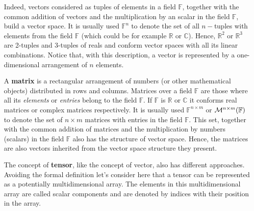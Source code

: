 Indeed, vectors considered as tuples of elements in a field $\mathbb{F}$, together with the common addition of vectors and the multiplication by an scalar in the field $\mathbb{F}$, build a vector space. 
It is usually used $\mathbb{F}^{n}$ to denote the set of all $n-$tuples with elements from the field $\mathbb{F}$ (which could be for example $\mathbb{R}$ or $\mathbb{C}$). 
Hence, $\mathbb{R}^{2}$ or $\mathbb{R}^{3}$ are 2-tuples and 3-tuples of reals and conform vector spaces with all its linear combinations.
Notice that, with this description, a vector is represented by a one-dimensional arrangement of $n$ elements. %

A \textbf{matrix} is a rectangular arrangement of numbers (or other mathematical objects) distributed in rows and columns.
Matrices over a field $\mathbb{F}$ are those where all its \textit{elements} or \textit{entries} belong to the field $\mathbb{F}$.
If $\mathbb{F}$ is $\mathbb{R}$ or $\mathbb{C}$ it conforms real matrices or complex matrices respectively.
It is usually used $\mathbb{F}^{n\times m}$ or  ${ \cal{M}}^{n \times m} (\mathbb{F})$ to denote the set of $n\times m$ matrices with entries in the field $\mathbb{F}$. 
This set, together with the common addition of matrices and the multiplication by numbers (scalars) in the field $\mathbb{F}$ also has the structure of vector space. 
Hence, the matrices are also vectors inherited from the vector space structure they present.

The concept of \textbf{tensor}, like the concept of vector, also has different approaches. 
Avoiding the formal definition let's consider here that a tensor can be represented as a potentially multidimensional array.
The elements in this multidimensional array are called scalar components and are denoted by indices with their position in the array.

